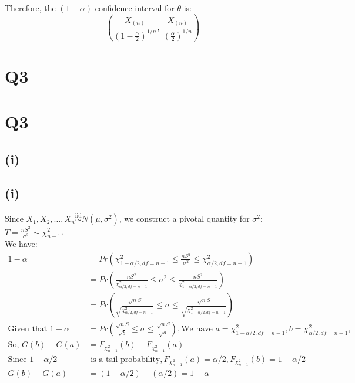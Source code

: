 \documentclass{article}
\newcommand{\mysectionstar}[2][]{%
    \ifthenelse{\equal{#1}{}}%
        {\section*{#2}}%
        {\section*[#1]{#2}}%
    \outline{1}{#2}%
}
\newcommand{\mysubsectionstar}[2][]{%
    \ifthenelse{\equal{#1}{}}%
        {\subsection*{#2}}%
        {\subsection*[#1]{#2}}%
    \outline{2}{#2}%
}
\begin{document}
Therefore, the \( (1 - \alpha) \) confidence interval for \( \theta \) is:
\[
\left(\frac{X_{(n)}}{(1 - \frac{\alpha}{2})^{1/n}}, \ \frac{X_{(n)}}{(\frac{\alpha}{2})^{1/n}}\right)
\]

\mysectionstar{Q3}

\mysubsectionstar{(i)}

Since $X_1, X_2, \ldots, X_n \overset{\text{iid}}{\sim} N(\mu, \sigma^2)$, we construct a pivotal quantity for $\sigma^2$: $T = \frac{nS^2}{\sigma^2} \sim \chi^2_{n-1}$. \\
We have:
\begin{align*}
1-\alpha &= Pr\left(\chi^2_{1-\alpha/2, df=n-1} \leq \frac{nS^2}{\sigma^2} \leq \chi^2_{\alpha/2, df=n-1}\right) \\
&= Pr\left(\frac{nS^2}{\chi^2_{\alpha/2, df=n-1}} \leq \sigma^2 \leq \frac{nS^2}{\chi^2_{1-\alpha/2, df=n-1}}\right) \\
&= Pr\left(\frac{\sqrt{n}S}{\sqrt{\chi^2_{\alpha/2, df=n-1}}} \leq \sigma \leq \frac{\sqrt{n}S}{\sqrt{\chi^2_{1-\alpha/2, df=n-1}}}\right) \\
\text{Given that } 1-\alpha &= Pr(\frac{\sqrt{n}S}{\sqrt{b}} \leq \sigma \leq \frac{\sqrt{n}S}{\sqrt{a}}), \text{We have } a = \chi^2_{1-\alpha/2, df=n-1}, b = \chi^2_{\alpha/2, df=n-1}, \\
\text{So, } G(b) - G(a) &= F_{\chi^2_{n-1}}(b) - F_{\chi^2_{n-1}}(a) \\
\text{Since } 1 - \alpha/2 & \text{ is a tail probability}, F_{\chi^2_{n-1}}(a) = \alpha/2, F_{\chi^2_{n-1}}(b) = 1 - \alpha/2 \\
G(b) - G(a) &= (1 - \alpha/2) - (\alpha/2) = 1 - \alpha
\end{align*}
\end{document}

